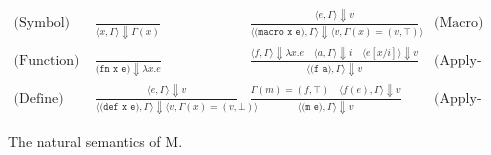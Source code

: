 \documentclass{article}
\begin{document}
    \begin{figure}[h]
        \centering
        \begin{align*}
            \text{(Symbol)}\;&\frac{\;}{\langle x,\Gamma\rangle\Downarrow\Gamma(x)}
            &\frac{\langle e,\Gamma\rangle\Downarrow v}{\langle\texttt{(macro x e)},\Gamma\rangle\Downarrow\langle v,\Gamma(x) = (v,\top)\rangle}&\;\text{(Macro)}\\
            \text{(Function)}\;&\frac{\;}{\texttt{(fn x e)}\Downarrow\lambda x.e}
            &\frac{\langle f,\Gamma\rangle\Downarrow\lambda x.e\quad\langle a,\Gamma\rangle\Downarrow i\quad\langle e[x/i]\rangle\Downarrow v}{\langle\texttt{(f a)},\Gamma\rangle\Downarrow v}&\;\text{(Apply-Function)}\\
            \text{(Define)}\;&\frac{\langle e,\Gamma\rangle\Downarrow v}{\langle\texttt{(def x e)},\Gamma\rangle\Downarrow\langle v,\Gamma(x) = (v,\bot)\rangle}
            &\frac{\Gamma(m)=(f,\top)\quad\langle f(e),\Gamma\rangle\Downarrow v}{\langle\texttt{(m e)},\Gamma\rangle\Downarrow v}&\;\text{(Apply-Macro)}
        \end{align*}
        \caption{The natural semantics of M.}
    \end{figure}
\end{document}
